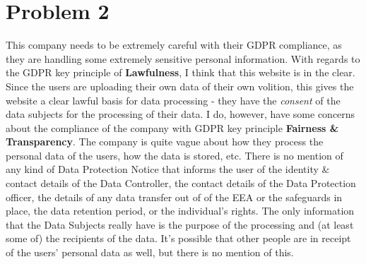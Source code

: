 \documentclass[a4paper]{article}
\begin{document}
\section{Problem 2}
This company needs to be extremely careful with their GDPR compliance, as they are handling some extremely sensitive personal information.
\newline\newline
With regards to the GDPR key principle of \textbf{Lawfulness}, I think that this website is in the clear.
Since the users are uploading their own data of their own volition, this gives the website a clear lawful basis for data processing - they have the \textit{consent} of the data subjects for the processing of their data.
\newline\newline
I do, however, have some concerns about the compliance of the company with GDPR key principle \textbf{Fairness \& Transparency}. The company is quite vague about how they process the personal data of the users, how the data is stored, etc.
There is no mention of any kind of Data Protection Notice that informs the user of the identity \& contact details of the Data Controller, the contact details of the Data Protection officer, the details of any data transfer out of of the EEA or the safeguards in place, the data retention period, or the individual's rights.
The only information that the Data Subjects really have is the purpose of the processing and (at least some of) the recipients of the data.
It's possible that other people are in receipt of the users' personal data as well, but there is no mention of this.

\bigbreak
\end{document}
